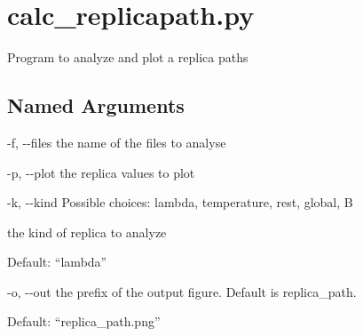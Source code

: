 \documentclass[letterpaper,10pt,english]{sphinxmanual}
\begin{document}
\section{calc\_replicapath.py}
\label{\detokenize{tools:calc-replicapath-py}}

Program to analyze and plot a replica paths


%
\begin{sphinxVerbatim}[commandchars=\\\{\}]
  \PYG{p}{[}\PYG{p}{]} \PYG{p}{[}  \PYG{p}{[} \PYG{p}{]}\PYG{p}{]} \PYG{p}{[}  \PYG{p}{[} \PYG{p}{]}\PYG{p}{]}
                           \PYG{p}{[} \PYG{p}{]} \PYG{p}{[} \PYG{p}{]}
\end{sphinxVerbatim}


\subsection{Named Arguments}
\label{\detokenize{tools:Named Arguments}}\begin{optionlist}{3cm}
\item [-f, -{-}files]  
the name of the files to analyse
\item [-p, -{-}plot]  
the replica values to plot
\item [-k, -{-}kind]  
Possible choices: lambda, temperature, rest, global, B

the kind of replica to analyze

Default: “lambda”
\item [-o, -{-}out]  
the prefix of the output figure. Default is replica\_path.

Default: “replica\_path.png”
\end{optionlist}

\end{document}
